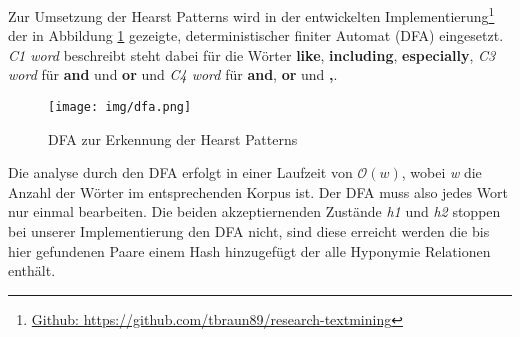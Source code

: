 %
Zur Umsetzung der Hearst Patterns wird in der entwickelten
Implementierung\footnote{\href{https://github.com/tbraun89/research-textmining}{Github:
 https://github.com/tbraun89/research-textmining}} der in Abbildung
\ref{fig:dfa} gezeigte, deterministischer finiter Automat (DFA)
eingesetzt. \textit{C1 word} beschreibt steht dabei für die Wörter
\textbf{like}, \textbf{including}, \textbf{especially}, \textit{C3
  word} für \textbf{and} und \textbf{or} und \textit{C4 word} für
\textbf{and}, \textbf{or} und \textbf{,}.%
%
\begin{figure}[h!] 
  \centering
  \texttt{[image: img/dfa.png]}
  \caption{DFA zur Erkennung der Hearst Patterns}
  \label{fig:dfa}
\end{figure}%
%
Die analyse durch den DFA erfolgt in einer Laufzeit von
$\mathcal{O}(w)$, wobei \textit{w} die Anzahl der Wörter im
entsprechenden Korpus ist. Der DFA muss also jedes Wort nur einmal
bearbeiten. Die beiden akzeptiernenden Zustände \textit{h1} und
\textit{h2} stoppen bei unserer Implementierung den DFA nicht, sind
diese erreicht werden die bis hier gefundenen Paare einem Hash
hinzugefügt der alle Hyponymie Relationen enthält.